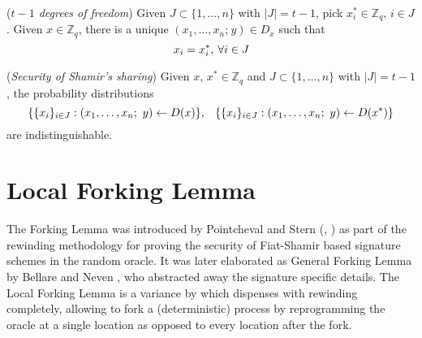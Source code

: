 \documentclass{iacrtrans}
\begin{document}
\begin{rem}\label{shamir_degrees_of_freedom}
(\textit{$t - 1$ degrees of freedom})
Given $J \subset \{1, \dots, n\}$ with $|J| = t - 1$,
pick $x^*_i \in \mathbb{Z}_q,\hspace{2pt} i \in J$.
Given $x \in \mathbb{Z}_q$, there is a unique
$(x_1, \dots, x_n;\hspace{1pt} y) \in D_x$
such that
\vspace{5pt}
\begin{equation*}
x_i = x^*_i,\hspace{2pt}\forall i \in J
\vspace{5pt}
\end{equation*}
\end{rem}

\begin{rem}\label{shamir_security}
(\textit{Security of Shamir's sharing})
Given $x,\hspace{2pt} x^* \in \mathbb{Z}_q$ and
$J \subset \{1, \dots, n\}$ with $|J| = t - 1$,
the probability distributions
\vspace{5pt}
\begin{equation*}
\{\{x_i\}_{i \in J}:
(x_1, \dots, x_n;\ y) \leftarrow D(x)\},
\hspace{8pt}
\{\{x_i\}_{i \in J}:
(x_1, \dots, x_n;\ y) \leftarrow D(x^*)\}
\vspace{5pt}
\end{equation*}
are indistinguishable.
\end{rem}

\section{Local Forking Lemma}\label{section_local_forking_lemma}

\noindent
The Forking Lemma was introduced by
Pointcheval and Stern
(\cite{paper_pointcheval_stern_1}, \cite{paper_pointcheval_stern_2})
as part of the rewinding methodology for proving
the security of Fiat-Shamir based signature schemes
in the random oracle. It was later elaborated as
General Forking Lemma by Bellare and Neven
\cite{paper_bellare_musig}, who
abstracted away the signature specific details.
The Local Forking Lemma is a variance
by \cite{paper_bellare_local_forking}
which dispenses with rewinding completely,
allowing to fork a (deterministic) process
by reprogramming the oracle at a single location
as opposed to every location after the fork.
\end{document}

